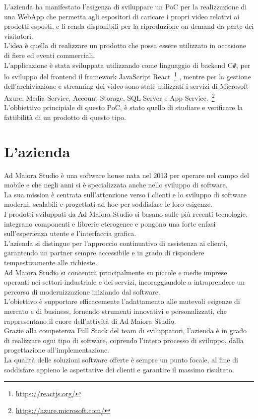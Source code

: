 L'azienda ha manifestato l'esigenza di sviluppare un PoC per la realizzazione di una WebApp che permetta agli espositori di caricare i propri video relativi ai prodotti esposti, e li renda disponibili per la riproduzione on-demand da parte dei visitatori.\\
L'idea è quella di realizzare un prodotto che possa essere utilizzato in occasione di fiere ed eventi commerciali.\\
L'applicazione è stata sviluppata utilizzando come linguaggio di backend C\texttt{\#}, per lo sviluppo del frontend il framework JavaScript React~\footnote{\url{https://reactjs.org/}}  ,
mentre per la gestione dell'archiviazione e streaming dei video sono stati utilizzati i servizi di Microsoft Azure: Media Service, Account Storage, SQL Server e App Service.~\footnote{\url{https://azure.microsoft.com/}}\\
L'obbiettivo principiale di questo PoC, è stato quello di studiare e verificare la fattibilità di un prodotto di questo tipo.\\
\section{L'azienda}

Ad Maiora Studio è una software house nata nel 2013 per operare nel campo del mobile e che negli anni si è specializzata anche nello sviluppo di software.\\
La sua mission è centrata sull'attenzione verso i clienti e lo sviluppo di software moderni, scalabili e progettati ad hoc per soddisfare le loro esigenze. \\
I prodotti sviluppati da Ad Maiora Studio si basano sulle più recenti tecnologie, integrano componenti e librerie eterogenee e pongono una forte enfasi sull'esperienza utente
 e l'interfaccia grafica.\\
L'azienda si distingue per l'approccio continuativo di assistenza ai clienti, 
garantendo un partner sempre accessibile e in grado di rispondere tempestivamente alle richieste. \\
Ad Maiora Studio si concentra principalmente su piccole e medie imprese operanti nei settori industriale e dei servizi, incoraggiandole a intraprendere un percorso di modernizzazione
 iniziando dal software.\\
L'obiettivo è supportare efficacemente l'adattamento alle mutevoli esigenze di mercato e di business, fornendo strumenti innovativi e personalizzati, che rappresentano il cuore dell'attività di Ad Maiora Studio.\\
Grazie alla competenza Full Stack del team di sviluppatori, l'azienda è in grado di realizzare ogni tipo di software, 
coprendo l'intero processo di sviluppo, dalla progettazione all'implementazione.\\
La qualità delle soluzioni software offerte è sempre un punto focale, al fine di soddisfare appieno le aspettative dei clienti e garantire il massimo risultato.



